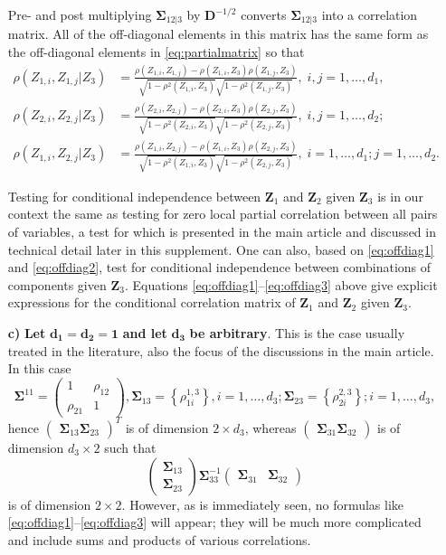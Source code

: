 \documentclass[
  12pt,
  letterpaper]{article}
\numberwithin{equation}{section}
\newcommand{\Z}{\bm{Z}}
\newcommand{\D}{\bm{D}}
\newcommand{\fSigma}{\bm{\Sigma}}
\begin{document}
\begin{itemize}
Pre- and post multiplying $\fSigma_{12|3}$ by $\D^{-1/2}$ converts $\fSigma_{12|3}$ into a correlation matrix. All of the off-diagonal elements in this matrix has the same form as the off-diagonal elements in \eqref{eq:partialmatrix} so that
\begin{align}
\rho(Z_{1,i},Z_{1,j}|Z_3) &= \frac{\rho(Z_{1,i},Z_{1,j}) - \rho(Z_{1,i},Z_3)\rho(Z_{1,j},Z_3)}{\sqrt{1-\rho^2(Z_{1,i},Z_3)} \sqrt{1-\rho^2(Z_{1,j},Z_3)}} 
, \; i,j = 1,\ldots,d_1, \label{eq:offdiag1}\\
\rho(Z_{2,i},Z_{2,j}|Z_3) &= \frac{\rho(Z_{2,i},Z_{2,j}) - \rho(Z_{2,i},Z_3)\rho(Z_{2,j},Z_3)}{\sqrt{1-\rho^2(Z_{2,i},Z_3)} \sqrt{1-\rho^2(Z_{2,j},Z_3)}}
, \; i,j = 1,\ldots,d_2; \label{eq:offdiag2} \\
\rho(Z_{1,i},Z_{2,j}|Z_3) &= \frac{\rho(Z_{1,i},Z_{2,j}) - \rho(Z_{1,i},Z_3)\rho(Z_{2,j},Z_3)}{\sqrt{1-\rho^2(Z_{1,i},Z_3)} \sqrt{1-\rho^2(Z_{2,j},Z_3)}}
, \; i = 1,\ldots,d_1; j=1,\ldots,d_2. \label{eq:offdiag3}
\end{align}

Testing for conditional independence between $\Z_1$ and $\Z_2$ given $\Z_3$ is in our context the same as testing for zero local partial correlation between all pairs of variables, a test for which is presented in the main article and discussed in technical detail later in this supplement. One can also, based on \eqref{eq:offdiag1} and \eqref{eq:offdiag2}, test for conditional independence between combinations of components given $\Z_3$. Equations \eqref{eq:offdiag1}--\eqref{eq:offdiag3} above give explicit expressions for the conditional correlation matrix of $\Z_1$ and $\Z_2$ given $\Z_3$. 

\item[\textbf{c)}] \textbf{Let} $\bm{d_1 = d_2 = 1}$ \textbf{and let} $\bm{d_3}$ \textbf{be arbitrary}. This is the case usually treated in the literature, also the focus of the discussions in the main article. In this case
$$\fSigma^{11} = \begin{pmatrix} 1 & \rho_{12} \\ \rho_{21} & 1 \end{pmatrix}, \fSigma_{13} = \left\{\rho_{1i}^{1,3}\right\}, i=1,\ldots,d_3; \fSigma_{23} = \left\{\rho_{2i}^{2,3}\right\}; i=1,\ldots,d_3,$$
hence $\begin{pmatrix} \fSigma_{13} \fSigma_{23}\end{pmatrix}^T$ is of dimension $2\times d_3$, whereas $\begin{pmatrix} \fSigma_{31} \fSigma_{32}\end{pmatrix}$ is of dimension $d_3\times 2$ such that
$$\begin{pmatrix} \fSigma_{13} \\ \fSigma_{23} \end{pmatrix} \fSigma_{33}^{-1} \begin{pmatrix} \fSigma_{31} & \fSigma_32 \end{pmatrix}$$
is of dimension $2\times2$. However, as is immediately seen, no formulas like \eqref{eq:offdiag1}--\eqref{eq:offdiag3} will appear; they will be much more complicated and include sums and products of various correlations.


\end{itemize}
\end{document}
